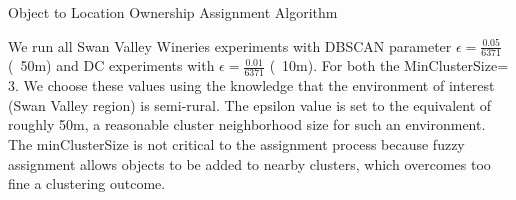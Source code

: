 \begin{algorithm}
    \caption{Object to Location Ownership Assignment Algorithm}
    \label{alg:OwnershipAssignment}
    \begin{algorithmic}
        \State{- - - - - - - - - -}
                \EndFor
            \EndFor
            \EndFor
            \EndFor 
        \EndProcedure
    \end{algorithmic}
\end{algorithm}

We run all Swan Valley Wineries experiments with DBSCAN parameter $\epsilon = \frac{0.05}{6371}$ (~50m) and DC experiments with $\epsilon = \frac{0.01}{6371}$ (~10m). For both the MinClusterSize=$3$. We choose these values using the knowledge that the environment of interest (Swan Valley region) is semi-rural. The epsilon value is set to the equivalent of roughly 50m, a reasonable cluster neighborhood size for such an environment. The minClusterSize is not critical to the assignment process because fuzzy assignment allows objects to be added to nearby clusters, which overcomes too fine a clustering outcome. 





